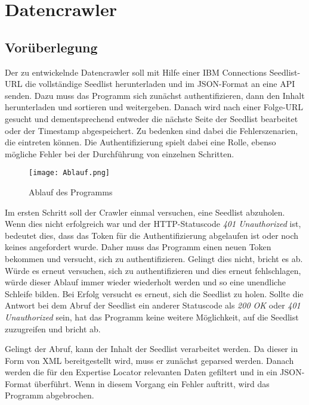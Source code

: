 
\chapter{Datencrawler}

\section{Vorüberlegung}
Der zu entwickelnde Datencrawler soll mit Hilfe einer IBM Connections Seedlist-\ac{URL} die vollständige Seedlist herunterladen und im \acs{JSON}-Format an eine \acs{API} senden. Dazu muss das Programm sich zunächst authentifizieren, dann den Inhalt herunterladen und sortieren und weitergeben. Danach wird nach einer Folge-\ac{URL} gesucht und dementsprechend entweder die nächste Seite der Seedlist bearbeitet oder der Timestamp abgespeichert. Zu bedenken sind dabei die Fehlerszenarien, die eintreten können. Die Authentifizierung spielt dabei eine Rolle, ebenso mögliche Fehler bei der Durchführung von einzelnen Schritten.
\begin{figure}[ht]
\centering
\texttt{[image: Ablauf.png]}
\caption{Ablauf des Programms}
\end{figure}

Im ersten Schritt soll der Crawler einmal versuchen, eine Seedlist abzuholen. Wenn dies nicht erfolgreich war und der HTTP-Statuscode \textit{401 Unauthorized} ist, bedeutet dies, dass das Token für die Authentifizierung abgelaufen ist oder noch keines angefordert wurde. Daher muss das Programm einen neuen Token bekommen und versucht, sich zu authentifizieren. Gelingt dies nicht, bricht es ab. Würde es erneut versuchen, sich zu authentifizieren und dies erneut fehlschlagen, würde dieser Ablauf immer wieder wiederholt werden und so eine unendliche Schleife bilden. Bei Erfolg versucht es erneut, sich die Seedlist zu holen. Sollte die Antwort bei dem Abruf der Seedlist ein anderer Statuscode als \textit{200 OK} oder \textit{401 Unauthorized} sein, hat das Programm keine weitere Möglichkeit, auf die Seedlist zuzugreifen und bricht ab.

Gelingt der Abruf, kann der Inhalt der Seedlist verarbeitet werden. Da dieser in Form von XML bereitgestellt wird, muss er zunächst geparsed werden. Danach werden die für den Expertise Locator relevanten Daten gefiltert und in ein \acs{JSON}-Format überführt. Wenn in diesem Vorgang ein Fehler auftritt, wird das Programm abgebrochen.

